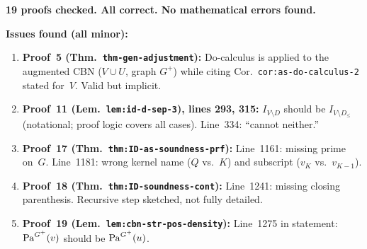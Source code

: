 \documentclass{article}
\begin{document}
\textbf{19 proofs checked.  All correct.  No mathematical errors found.}

\bigskip\noindent
\textbf{Issues found (all minor):}
\begin{enumerate}
  \item \textbf{Proof~5 (Thm.\ \texttt{thm-gen-adjustment}):}
    Do-calculus is applied to the augmented CBN ($V\cup U$, graph $G^+$)
    while citing Cor.\ \texttt{cor:as-do-calculus-2} stated for~$V$.
    Valid but implicit.
  \item \textbf{Proof~11 (Lem.\ \texttt{lem:id-d-sep-3}), lines 293, 315:}
    $I_{V\setminus D}$ should be $I_{V\setminus D_\le}$ (notational;
    proof logic covers all cases).  Line~334: ``cannot neither.''
  \item \textbf{Proof~17 (Thm.\ \texttt{thm:ID-as-soundness-prf}):}
    Line~1161: missing prime on~$G$.
    Line~1181: wrong kernel name ($Q$ vs.\ $K$) and subscript ($v_K$ vs.\ $v_{K-1}$).
  \item \textbf{Proof~18 (Thm.\ \texttt{thm:ID-soundness-cont}):}
    Line~1241: missing closing parenthesis.
    Recursive step sketched, not fully detailed.
  \item \textbf{Proof~19 (Lem.\ \texttt{lem:cbn-str-pos-density}):}
    Line~1275 in statement: $\mathrm{Pa}^{G^+}(v)$ should be $\mathrm{Pa}^{G^+}(u)$.
\end{enumerate}
\end{document}
